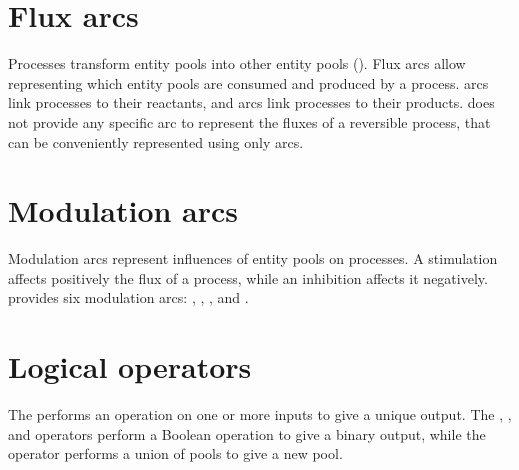

\section{Flux arcs}
\label{sec:fluxes}

Processes transform entity pools into other entity pools ().
Flux arcs allow representing which entity pools are consumed and produced by a process.
 arcs link processes to their reactants, and  arcs link processes to their products.
\SBGNPDLone does not provide any specific arc to represent the fluxes of a reversible process, that can be conveniently represented using only  arcs.




\section{Modulation arcs}
\label{sec:modulations}

Modulation arcs represent influences of entity pools on processes.
A stimulation affects positively the flux of a process, while an inhibition affects it negatively.
\SBGNPDLone provides six modulation arcs: , , ,  and .








\section{Logical operators}

\label{sec:logic}

The  performs an operation on one or more inputs to give a unique output.
The , , and  operators perform a Boolean operation to give a binary output, while the  operator performs a union of pools to give a new pool.


